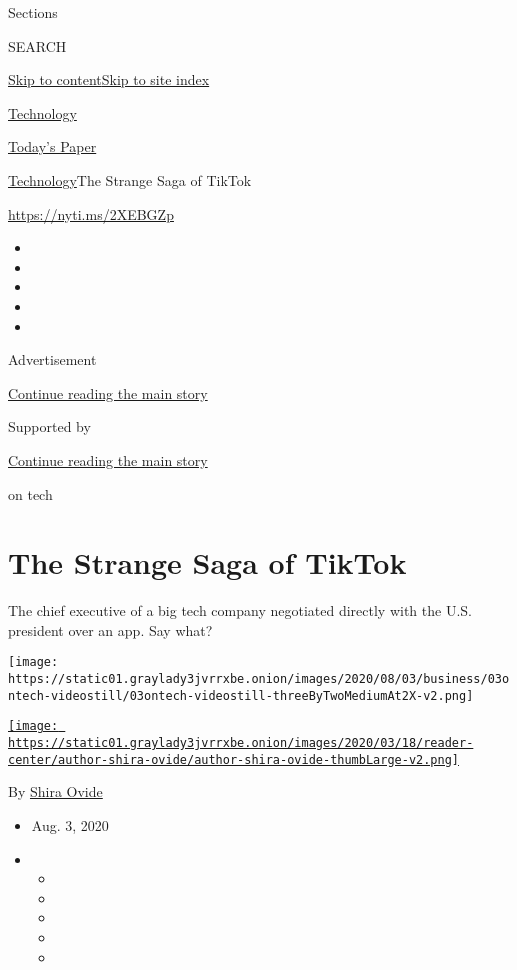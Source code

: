 Sections

SEARCH

\protect\hyperlink{site-content}{Skip to
content}\protect\hyperlink{site-index}{Skip to site index}

\href{https://www.nytimes3xbfgragh.onion/section/technology}{Technology}

\href{https://myaccount.nytimes3xbfgragh.onion/auth/login?response_type=cookie\&client_id=vi}{}

\href{https://www.nytimes3xbfgragh.onion/section/todayspaper}{Today's
Paper}

\href{/section/technology}{Technology}\textbar{}The Strange Saga of
TikTok

\url{https://nyti.ms/2XEBGZp}

\begin{itemize}
\item
\item
\item
\item
\item
\end{itemize}

Advertisement

\protect\hyperlink{after-top}{Continue reading the main story}

Supported by

\protect\hyperlink{after-sponsor}{Continue reading the main story}

on tech

\hypertarget{the-strange-saga-of-tiktok}{%
\section{The Strange Saga of TikTok}\label{the-strange-saga-of-tiktok}}

The chief executive of a big tech company negotiated directly with the
U.S. president over an app. Say what?

\texttt{[image: https://static01.graylady3jvrrxbe.onion/images/2020/08/03/business/03ontech-videostill/03ontech-videostill-threeByTwoMediumAt2X-v2.png]}

\href{https://www.nytimes3xbfgragh.onion/by/shira-ovide}{\texttt{[image: https://static01.graylady3jvrrxbe.onion/images/2020/03/18/reader-center/author-shira-ovide/author-shira-ovide-thumbLarge-v2.png]}}

By \href{https://www.nytimes3xbfgragh.onion/by/shira-ovide}{Shira Ovide}

\begin{itemize}
\item
  Aug. 3, 2020
\item
  \begin{itemize}
  \item
  \item
  \item
  \item
  \item
  \end{itemize}
\end{itemize}

